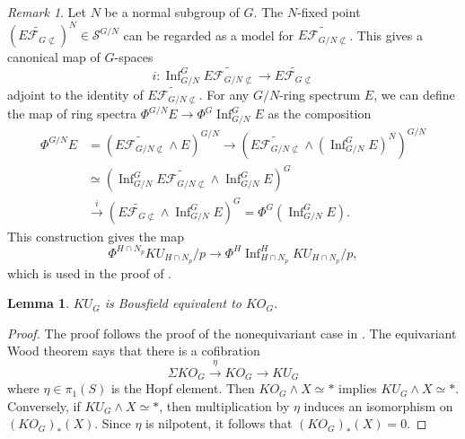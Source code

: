 \documentclass{amsart}
\theoremstyle{plain}
\newtheorem{lemma}[theorem]{Lemma}
\theoremstyle{definition}
\theoremstyle{remark}
\newtheorem{remark}[theorem]{Remark}
\begin{document}
\begin{remark}
     Let $N$ be a normal subgroup of $G$. The $N$-fixed point $(\widetilde{E\mathcal{F}_{G\not\subset}})^{N}\in \mathcal{S}^{G/N}$ can be regarded as a model for $\widetilde{E\mathcal{F}_{G/N \not\subset}}$. This gives a canonical map of $G$-spaces 
    $$i:\operatorname{Inf}_{G/N}^G \widetilde{E\mathcal{F}_{G/N \not\subset}} \to \widetilde{E \mathcal{F}_{G\not\subset}}$$
    adjoint to the identity of $\widetilde{E\mathcal{F}_{G/N \not\subset}}$.
    For any $G/N$-ring spectrum $E$, we can define the map of ring spectra $\Phi^{G/N}E\to \Phi^{G}\operatorname{Inf}_{G/N}^G E$ as the composition
    \[
    \begin{aligned}
        \Phi^{G/N}E&=(\widetilde{E\mathcal{F}_{G/N\not\subset}}\wedge E)^{G/N}\to (\widetilde{E\mathcal{F}_{G/N\not\subset}}\wedge (\operatorname{Inf}_{G/N}^G E)^N)^{G/N}\\
        &\simeq (\operatorname{Inf}_{G/N}^G \widetilde{E\mathcal{F}_{G/N\not\subset}} \wedge \operatorname{Inf}_{G/N}^G E)^G\\
        &\overset{i}{\to} (\widetilde{E \mathcal{F}_{G\not\subset}}\wedge \operatorname{Inf}_{G/N}^G E)^G=\Phi^G(\operatorname{Inf}_{G/N}^G E).
    \end{aligned}
    \]
    This construction gives the map 
    \[\Phi^{H\cap N_p} KU_{H\cap N_p}/p\to \Phi^H \operatorname{Inf}_{H\cap N_p}^H KU_{H\cap N_p}/p, \]
    which is used in the proof of .
\end{remark}



\begin{lemma}\label{lem:bousfield class of ko}
    $KU_G$ is Bousfield equivalent to $KO_G$. 
\end{lemma}
\begin{proof}
   The proof follows the proof of the nonequivariant case in \cite[Theorem 8.4]{Ravenel1984LocalizationWR}. The equivariant Wood theorem \cite[Theorem 9.8]{mathew2017nilpotence} says that there is a cofibration 
    \[
    \Sigma KO_G \overset{\eta}{\longrightarrow} KO_G \longrightarrow KU_G
    \]
    where $\eta\in \pi_1(S)$ is the Hopf element. Then $KO_G\wedge X\simeq \ast$ implies $KU_G\wedge X\simeq \ast$. Conversely, if $KU_G\wedge X\simeq \ast$, then multiplication by $\eta$ induces an isomorphism on $(KO_G)_*(X)$. Since $\eta$ is nilpotent, it follows that $(KO_G)_*(X)=0$. 
\end{proof}
\end{document}
